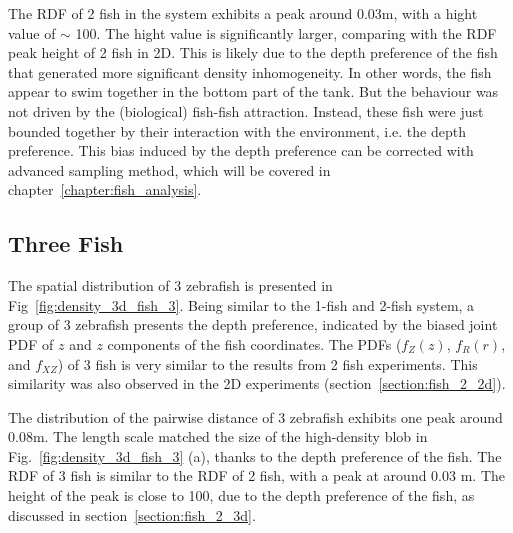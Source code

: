 \documentclass[11pt,twoside]{report}
\begin{document}
The RDF of 2 fish in the system exhibits a peak around 0.03m, with a hight value of $\sim$ 100. The hight value is significantly larger, comparing with the RDF peak height of 2 fish in 2D.
This is likely due to the depth preference of the fish that generated more significant density inhomogeneity. In other words, the fish appear to swim together in the bottom part of the tank. But the behaviour was not driven by the (biological) fish-fish attraction. Instead, these fish were just bounded together by their interaction with the environment, i.e. the depth preference. This bias induced by the depth preference can be corrected with advanced sampling method, which will be covered in chapter~\ref{chapter:fish_analysis}.


\subsection{Three Fish}
\label{section:fish_3_3d}

The spatial distribution of 3 zebrafish is presented in Fig~\ref{fig:density_3d_fish_3}. Being similar to the 1-fish and 2-fish system, a group of 3 zebrafish presents the depth preference, indicated by the biased joint PDF of $z$ and $z$ components of the fish coordinates. The PDFs ($f_Z(z)$, $f_R(r)$, and $f_{XZ}$) of 3 fish is very similar to the results from 2 fish experiments. This similarity was also observed in the 2D experiments (section~\ref{section:fish_2_2d}).

The distribution of the pairwise distance of 3 zebrafish exhibits one peak around 0.08m. The length scale matched the size of the high-density blob in Fig.~\ref{fig:density_3d_fish_3} (a), thanks to the depth preference of the fish. The RDF of 3 fish is similar to the RDF of 2 fish, with a peak at around 0.03 m. The height of the peak is close to 100, due to the depth preference of the fish, as discussed in section~\ref{section:fish_2_3d}.
\end{document}

